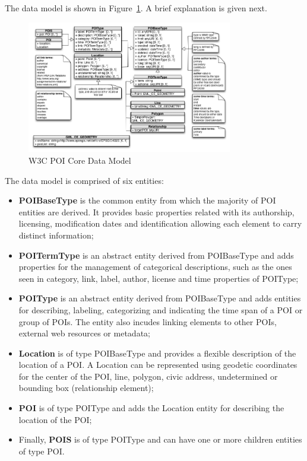 \documentclass[times]{ettauth}
\begin{document}
The data model is shown in Figure~\ref{fig:data-model}. A brief explanation is given next.

\begin{figure}[!ht]
\centering
\includegraphics[width=0.8\textwidth]{images/uml}
\caption{W3C POI Core Data Model}
\label{fig:data-model}
\end{figure}

The data model is comprised of six entities:
\begin{itemize}
\item \textbf{POIBaseType} is the common entity from which the majority of POI entities are derived. It provides basic properties related with its authorship, licensing, modification dates and identification allowing each element to carry distinct information;
\item \textbf{POITermType} is an abstract entity derived from POIBaseType and adds properties for the management of categorical descriptions, such as the ones seen in category, link, label, author, license and time properties of POIType;
\item \textbf{POIType} is an abstract entity derived from POIBaseType and adds entities for describing, labeling, categorizing and indicating the time span of a POI or group of POIs. The entity also incudes linking elements to other POIs, external web resources or metadata;
\item \textbf{Location} is of type POIBaseType and provides a flexible description of the location of a POI. A Location can be represented using geodetic coordinates for the center of the POI, line, polygon, civic address,  undetermined or bounding box (relationship element);
\item \textbf{POI} is of type POIType and adds the Location entity for describing the location of the POI;
\item Finally, \textbf{POIS} is of type POIType and can have one or more children entities of type POI.
\end{itemize}
\end{document}
